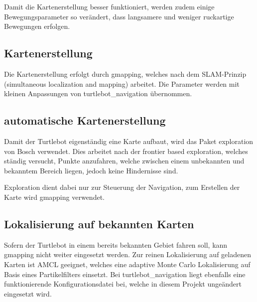 Damit die Kartenerstellung besser funktioniert, werden zudem einige Bewegungsparameter so verändert, dass langsamere und weniger ruckartige Bewegungen erfolgen.

\subsection{Kartenerstellung}
Die Kartenerstellung erfolgt durch gmapping, welches nach dem SLAM-Prinzip (simultaneous localization and mapping) arbeitet. Die Parameter werden mit kleinen Anpassungen von turtlebot_navigation übernommen.

\subsection{automatische Kartenerstellung}
Damit der Turtlebot eigenständig eine Karte aufbaut, wird das Paket exploration von Bosch verwendet. Dies arbeitet nach der frontier based exploration, welches ständig versucht, Punkte anzufahren, welche zwischen einem unbekannten und bekanntem Bereich liegen, jedoch keine Hindernisse sind.

Exploration dient dabei nur zur Steuerung der Navigation, zum Erstellen der Karte wird gmapping verwendet.

\subsection{Lokalisierung auf bekannten Karten}
Sofern der Turtlebot in einem bereits bekannten Gebiet fahren soll, kann gmapping nicht weiter eingesetzt werden. Zur reinen Lokalisierung auf geladenen Karten ist AMCL geeignet, welches eine adaptive Monte Carlo Lokalisierung auf Basis eines Partikelfilters einsetzt. Bei turtlebot_navigation liegt ebenfalls eine funktionierende Konfigurationsdatei bei, welche in diesem Projekt ungeändert eingesetzt wird.



